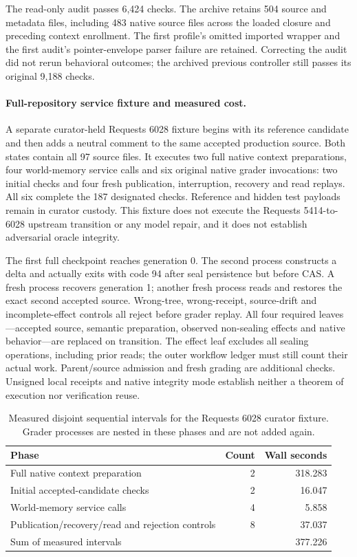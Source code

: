 The read-only audit passes 6,424 checks. The archive retains 504 source and
metadata files, including 483 native source files across the loaded closure
and preceding context enrollment. The first profile's omitted imported wrapper
and the first audit's pointer-envelope parser failure are retained. Correcting
the audit did not rerun behavioral outcomes; the archived previous controller
still passes its original 9,188 checks.

\paragraph{Full-repository service fixture and measured cost.}
A separate curator-held Requests 6028 fixture begins with its reference
candidate and then adds a neutral comment to the same accepted production
source. Both states contain all 97 source files. It executes two full native
context preparations, four world-memory service calls and six original native
grader invocations: two initial checks and four fresh publication, interruption,
recovery and read replays. All six complete the 187 designated checks.
Reference and hidden test payloads remain in curator custody. This fixture
does not execute the Requests 5414-to-6028 upstream transition or any model
repair, and it does not establish adversarial oracle integrity.

The first full checkpoint reaches generation 0. The second process constructs
a delta and actually exits with code 94 after seal persistence but before CAS.
A fresh process recovers generation 1; another fresh process reads and restores
the exact second accepted source. Wrong-tree, wrong-receipt, source-drift and
incomplete-effect controls all reject before grader replay. All four required
leaves---accepted source, semantic preparation, observed non-sealing effects
and native behavior---are replaced on transition. The effect leaf excludes
all sealing operations, including prior reads; the outer workflow ledger must
still count their actual work. Parent/source admission and fresh grading are
additional checks. Unsigned local receipts and native integrity mode establish
neither a theorem of execution nor verification reuse.

\begin{table}[htbp]
\centering
\caption{Measured disjoint sequential intervals for the Requests 6028 curator
fixture. Grader processes are nested in these phases and are not added again.}
\begin{tabular}{lrr}
\toprule
Phase & Count & Wall seconds \\
\midrule
Full native context preparation & 2 & 318.283 \\
Initial accepted-candidate checks & 2 & 16.047 \\
World-memory service calls & 4 & 5.858 \\
Publication/recovery/read and rejection controls & 8 & 37.037 \\
\midrule
Sum of measured intervals & & 377.226 \\
\bottomrule
\end{tabular}
\end{table}

